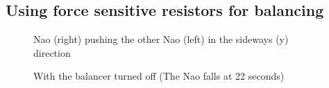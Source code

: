 \documentclass[a4paper]{article}
\begin{document}
\subsection{Using force sensitive resistors for balancing}
\begin{figure}[htbp]
  \centering
  \caption{Nao (right) pushing the other Nao (left) in the sideways (y) direction}
  \label{fig:pushing}
\end{figure}
\begin{figure}[htbp]
  \centering
  \caption{With the balancer turned off (The Nao falls at 22 seconds)}
  \label{fig:pushing1}
\end{figure}
\end{document}
